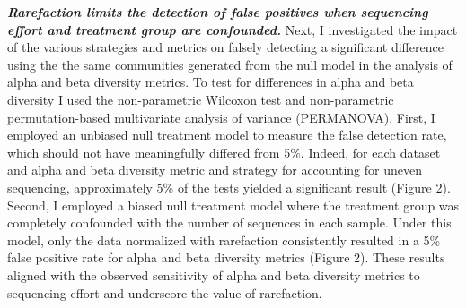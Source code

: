 \documentclass[
]{article}
\begin{document}
\textbf{\emph{Rarefaction limits the detection of false positives when
sequencing effort and treatment group are confounded.}} Next, I
investigated the impact of the various strategies and metrics on falsely
detecting a significant difference using the the same communities
generated from the null model in the analysis of alpha and beta
diversity metrics. To test for differences in alpha and beta diversity I
used the non-parametric Wilcoxon test and non-parametric
permutation-based multivariate analysis of variance (PERMANOVA). First,
I employed an unbiased null treatment model to measure the false
detection rate, which should not have meaningfully differed from 5\%.
Indeed, for each dataset and alpha and beta diversity metric and
strategy for accounting for uneven sequencing, approximately 5\% of the
tests yielded a significant result (Figure 2). Second, I employed a
biased null treatment model where the treatment group was completely
confounded with the number of sequences in each sample. Under this
model, only the data normalized with rarefaction consistently resulted
in a 5\% false positive rate for alpha and beta diversity metrics
(Figure 2). These results aligned with the observed sensitivity of alpha
and beta diversity metrics to sequencing effort and underscore the value
of rarefaction.
\end{document}

